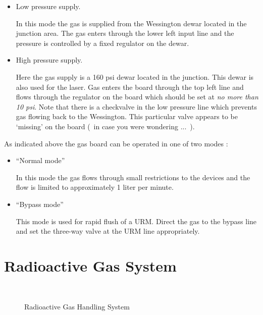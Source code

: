 \begin{itemize}

\item Low pressure supply.

  In this mode the gas is supplied from the Wessington dewar located in 
the junction area.  The gas enters through the lower left input line and 
the pressure is controlled by a fixed regulator on the dewar.


\item High pressure supply.

 Here the gas supply is a 160 psi dewar located in the junction. This dewar
is also used for the laser. Gas enters the board through the top 
left line and flows through the regulator on the board which should be 
set at { \em no more than 10 psi}. Note that there is a checkvalve in  the 
low pressure line which prevents gas flowing  back to the Wessington. This 
particular valve appears to be `missing' on the board (~in case you were 
wondering ...~).


\end{itemize}



 As indicated above the gas board can be operated in one of two modes :

\begin{itemize}

\item ``Normal mode''

  In this mode the gas flows through small restrictions to the devices 
and the flow is limited to approximately 1 liter per minute. 


\item ``Bypass mode'' 

  This mode is used  for rapid flush of a URM.   Direct the gas to the bypass
line and set the three-way valve at the URM line appropriately.


\end{itemize}
  



  
\clearpage
\section{Radioactive Gas System}

 
\begin{figure}[htb]
\begin{center}
\leavevmode
\epsfxsize=7in
~\\
\caption[Radioactive Gas system]
        {Radioactive Gas Handling System
        }
\end{center}
\end{figure}



